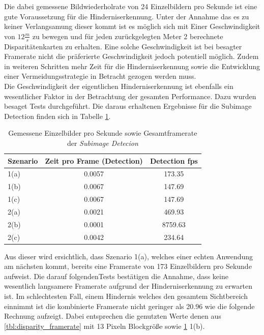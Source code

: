 \noindent
Die dabei gemessene Bildwiederholrate von 24 Einzelbildern pro Sekunde ist eine gute Voraussetzung für die Hinderniserkennung. Unter der Annahme das es zu keiner Verlangsamung dieser kommt ist es möglich sich mit Einer Geschwindigkeit von $12\frac{m}{s}$ zu bewegen und für jeden zurückgelegten Meter 2 berechnete Disparitätenkarten zu erhalten. Eine solche Geschwindigkeit ist bei besagter Framerate nicht die präferierte Geschwindigkeit jedoch potentiell möglich. Zudem in weiteren Schritten mehr Zeit für die Hinderniserkennung sowie die Entwicklung einer Vermeidungsstrategie in Betracht gezogen werden muss.\\

\noindent
Die Geschwindigkeit der eigentlichen Hinderniserkennung ist ebenfalls ein wesentlicher Faktor in der Betrachtung der gesamten Performance. Dazu wurden besaget Tests durchgeführt. Die daraus erhaltenen Ergebnisse für die Subimage Detection finden sich in Tabelle \ref{tbl:subimage_framerate}.

\begin{table}[h]
\centering
\begin{tabular}{|l|c|c|}
\hline
Szenario & Zeit pro Frame (Detection) & Detection fps \\ \hline \hline
1(a)     & 0.0057                     & 173.35        \\ \hline
1(b)     & 0.0067                     & 147.69        \\ \hline
1(c)     & 0.0067                     & 147.69        \\ \hline \hline
2(a)     & 0.0021                     & 469.93        \\ \hline
2(b)     & 0.0001                     & 8759.63       \\ \hline
2(c)     & 0.0042                     & 234.64        \\ \hline
\end{tabular}
\caption{Gemessene Einzelbilder pro Sekunde sowie Gesamtframerate der \emph{Subimage Detecion}}
\label{tbl:subimage_framerate}
\end{table}

\noindent
Aus dieser wird ersichtlich, dass Szenario 1(a), welches einer echten Anwendung am nächsten kommt, bereits eine Framerate von 173 Einzelbildern pro Sekunde aufweist. Die darauf folgendenTests bestätigen die Annahme, dass keine wesentlich langsamere Framerate aufgrund der Hinderniserkennung zu erwarten ist. Im schlechtesten Fall, einem Hindernis welches den gesamtem Sichtbereich einnimmt ist die kombinierte Framerate nicht geringer als 20.96 wie die folgende Rechnung aufzeigt. Dabei entsprechen die genutzten Werte denen aus \ref{tbl:disparity_framerate} mit 13 Pixeln Blockgröße sowie \ref{tbl:subimage_framerate} 1(b). 

